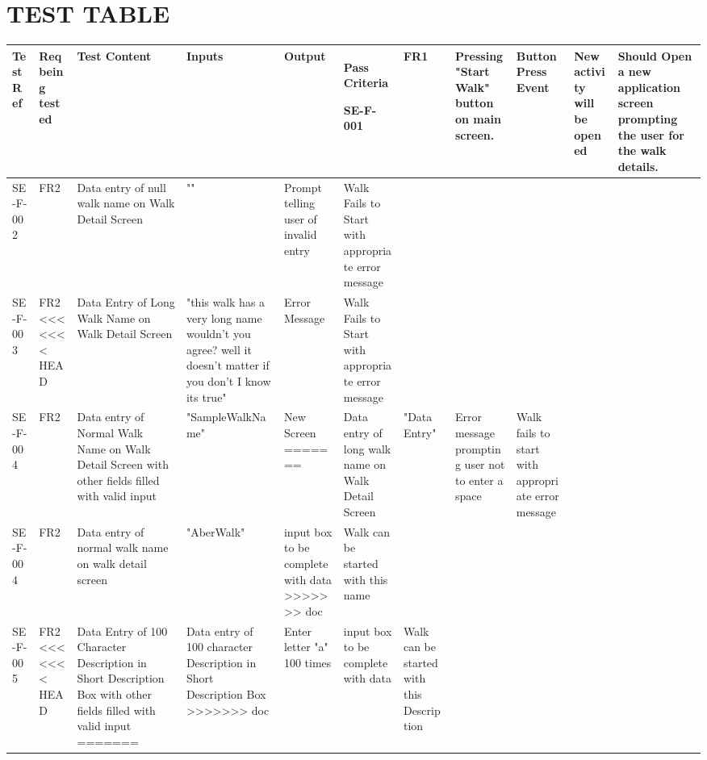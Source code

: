 \documentclass{project}
\begin{document}
\clearpage

\section{TEST TABLE}
\begin{small}
\begin{longtable}{ | p{1cm} | p{1cm} | p{2.5cm} | p{2.5cm} | p{2.5cm} | p{2.5cm} |} 

\hline 
{\bf Test Ref} & {\bf Req being tested} & {\bf Test Content} & {\bf Inputs} & {\bf Output} & {\bf Pass Criteria} \endhead  \hline

SE-F-001 
& FR1
& Pressing "Start Walk" button on main screen. 
& Button Press Event 
& New activity will be opened
&  Should Open a new application screen prompting the user for the walk details. \\ \hline

SE-F-002
& FR2
& Data entry of null walk name on Walk Detail Screen  
& "" 
& Prompt telling user of invalid entry
& Walk Fails to Start with appropriate error message\\ \hline

SE-F-003 
& FR2
<<<<<<< HEAD
& Data Entry of Long Walk Name on Walk Detail Screen  
& "this walk has a very long name wouldn't you agree? well it doesn't matter if you don't I know its true"
& Error Message
& Walk Fails to Start with appropriate error message\\ \hline

SE-F-004
& FR2
& Data entry of Normal Walk Name on Walk Detail Screen with other fields filled with valid input
& "SampleWalkName"
& New Screen
=======
& Data entry of long walk name on Walk Detail Screen  
& "Data Entry"
& Error message prompting user not to enter a space
& Walk fails to start with appropriate error message\\ \hline

SE-F-004
& FR2
& Data entry of normal walk name on walk detail screen
& "AberWalk"
& input box to be complete with data
>>>>>>> doc
& Walk can be started with this name \\ \hline

SE-F-005
& FR2
<<<<<<< HEAD
& Data Entry of 100 Character Description in Short Description Box with other fields filled with valid input
=======
& Data entry of 100 character Description in Short Description Box
>>>>>>> doc
& Enter letter "a" 100 times
& input box to be complete with data
& Walk can be started with this Description \\ \hline


\end{longtable}
\end{small}
\end{document}
